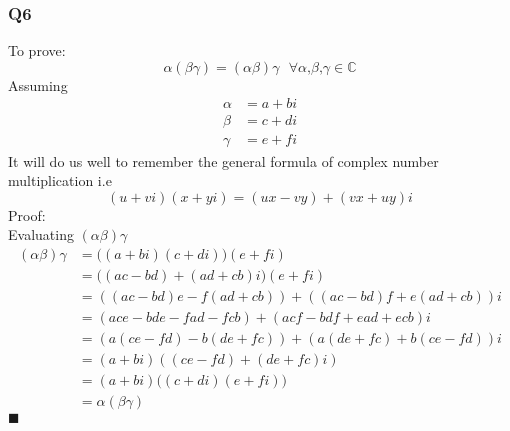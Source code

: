 \documentclass{article}
\begin{document}
\subsubsection*{Q6}
To prove:
\begin{equation*}
  \alpha\left(\beta\gamma \right) = \left( \alpha \beta \right) \gamma \textrm{ }\forall \alpha \textrm{,} \beta \textrm{,} \gamma \in \mathbb{C}
\end{equation*}
Assuming
\begin{align*}
  \alpha &= a + bi \\
  \beta &= c + di \\
  \gamma &= e + fi
\end{align*}
It will do us well to remember the general formula of complex number
multiplication i.e
\begin{equation*}
  (u + vi)(x + yi) = (ux - vy) + (vx + uy)i
\end{equation*}  
Proof:\\
Evaluating $(\alpha\beta)\gamma$ \\
\begin{align*}
  (\alpha\beta)\gamma &= \Big( (a+bi)(c+di) \Big)(e+fi) \\
                      &= \Big((ac - bd) + (ad + cb)i\Big)(e+fi) \\
                      &= ((ac - bd)e - f(ad +cb)) + ((ac-bd)f + e(ad + cb))i \\
                      &= (ace -bde - fad - fcb) + (acf - bdf + ead + ecb)i \\
                      &= (a(ce-fd)-b(de + fc)) + (a(de+fc) + b(ce - fd))i \\
                      &= (a + bi) ((ce-fd) + (de+fc)i) \\
                      &= (a+bi)\Big( (c+di)(e + fi) \Big) \\
                      &= \alpha (\beta\gamma)
\end{align*} 
$\blacksquare$
\end{document}
